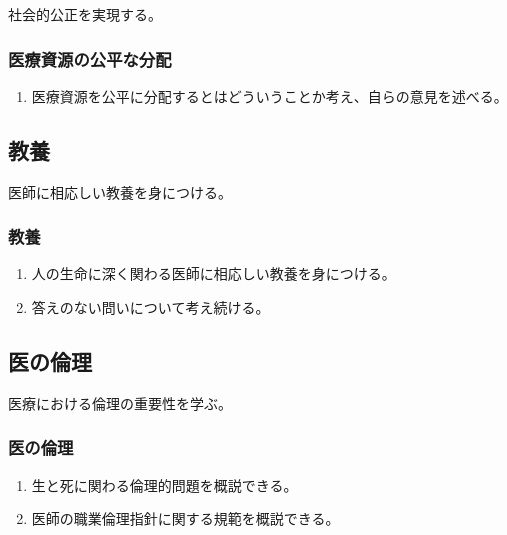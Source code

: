 社会的公正を実現する。

\hypertarget{ux533bux7642ux8cc7ux6e90ux306eux516cux5e73ux306aux5206ux914d}{%
\subsubsection{医療資源の公平な分配}\label{ux533bux7642ux8cc7ux6e90ux306eux516cux5e73ux306aux5206ux914d}}

\begin{enumerate}
\def\labelenumi{\arabic{enumi}.}
\tightlist
\item
  医療資源を公平に分配するとはどういうことか考え、自らの意見を述べる。
\end{enumerate}

\hypertarget{ux6559ux990a}{%
\subsection{教養}\label{ux6559ux990a}}

医師に相応しい教養を身につける。

\hypertarget{ux6559ux990a-1}{%
\subsubsection{教養}\label{ux6559ux990a-1}}

\begin{enumerate}
\def\labelenumi{\arabic{enumi}.}
\tightlist
\item
  人の生命に深く関わる医師に相応しい教養を身につける。
\item
  答えのない問いについて考え続ける。
\end{enumerate}

\hypertarget{ux533bux306eux502bux7406}{%
\subsection{医の倫理}\label{ux533bux306eux502bux7406}}

医療における倫理の重要性を学ぶ。

\hypertarget{ux533bux306eux502bux7406-1}{%
\subsubsection{医の倫理}\label{ux533bux306eux502bux7406-1}}

\begin{enumerate}
\def\labelenumi{\arabic{enumi}.}
\tightlist
\item
  生と死に関わる倫理的問題を概説できる。
\item
  医師の職業倫理指針に関する規範を概説できる。
\end{enumerate}

